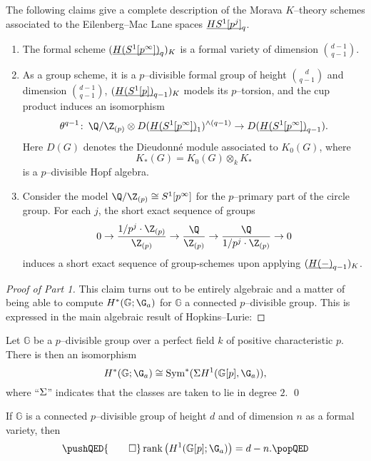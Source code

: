 \begin{theorem}\label{MainKThyOfEMSpacesTheorem}
The following claims give a complete description of the Morava \(K\)--theory schemes associated to the Eilenberg--Mac Lane spaces \(\OS{HS^1[p^j]}{q}\).
\begin{enumerate}
    \item The formal scheme \((\OS{H(S^1[p^\infty])}{q})_K\) is a formal variety of dimension \(\binom{d-1}{q-1}\).
    \item As a group scheme, it is a \(p\)--divisible formal group of height \(\binom{d}{q-1}\) and dimension \(\binom{d-1}{q-1}\), \((\OS{H(S^1[p])}{q-1})_K\) models its \(p\)--torsion, and the cup product induces an isomorphism \[\theta^{q-1}\co \Q / \Z_{(p)} \otimes D(\OS{H(S^1[p^\infty])}{1})^{\wedge (q-1)} \to D(\OS{H(S^1[p^\infty])}{q-1}).\]  Here \(D(G)\) denotes the Dieudonn\'e module associated to \(K_0(G)\), where \[K_*(G) = K_0(G) \otimes_k K_*\] is a \(p\)--divisible Hopf algebra.
    \item Consider the model \(\Q / \Z_{(p)} \cong S^1[p^\infty]\) for the \(p\)--primary part of the circle group.  For each \(j\), the short exact sequence of groups \[0 \to \frac{1/p^j \cdot \Z_{(p)}}{\Z_{(p)}} \to \frac{\Q}{\Z_{(p)}} \to \frac{\Q}{1/p^j \cdot \Z_{(p)}} \to 0\] induces a short exact sequence of group-schemes upon applying \((\OS{H(-)}{q-1})_K\).
\end{enumerate}
\end{theorem}
\begin{proof}[Proof of Part 1]\renewcommand{\qedsymbol}{\relax}
This claim turns out to be entirely algebraic and a matter of being able to compute \(H^*(\mathbb G; \G_a)\) for \(\mathbb G\) a connected \(p\)--divisible group.  This is expressed in the main algebraic result of Hopkins--Lurie:
\end{proof}

\begin{theorem}
Let \(\mathbb G\) be a \(p\)--divisible group over a perfect field \(k\) of positive characteristic \(p\).  There is then an isomorphism \[H^*(\mathbb G; \G_a) \cong \Sym^*(\Susp H^1(\mathbb G[p], \G_a)),\] where ``\(\Sigma\)'' indicates that the classes are taken to lie in degree \(2\). \qed
\end{theorem}

\begin{lemma}
If \(\mathbb G\) is a connected \(p\)--divisible group of height \(d\) and of dimension \(n\) as a formal variety, then
\[\pushQED{\qed}
\operatorname{rank}\left(H^1(\mathbb G[p]; \G_a)\right) = d - n. \qedhere
\popQED\]
\end{lemma}

